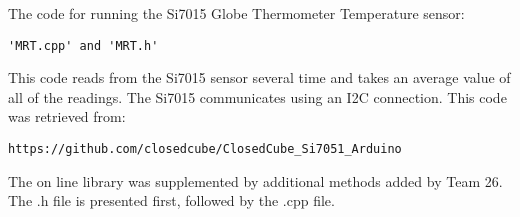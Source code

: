 \documentclass[12pt,letterpaper,titlepage]{article}
\begin{document}

The code for running the Si7015 Globe Thermometer Temperature sensor:
\begin{verbatim}
'MRT.cpp' and 'MRT.h'
\end{verbatim}
This code reads from the Si7015 sensor several time and takes an average value of all of the readings. The Si7015 communicates using an I2C connection. This code was retrieved from:
\begin{verbatim}
https://github.com/closedcube/ClosedCube_Si7051_Arduino
\end{verbatim}
The on line library was supplemented by additional methods added by Team 26. The .h file is presented first, followed by the .cpp file.


\end{document}
